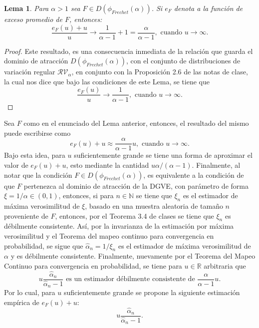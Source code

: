 \documentclass[10.5pt,notitlepage]{article}
\renewcommand{\qedsymbol}{$\blacksquare$}
\newcommand{\RR}{\mathbb{R}}
\newcommand{\NN}{\mathbb{N}}
\theoremstyle{plain}
\newtheorem{lem}[thm]{Lema} %
\newenvironment{rem}
  {\pushQED{\qed}\renewcommand{\qedsymbol}{$\triangle$}\remarkex}
  {\popQED\endremarkex}
\begin{document}
\begin{lem}\label{lem.3}
Para \(\alpha >1 \) sea \(F\in D(\phi_{Frechet}(\alpha))\). Si \(e_{F}\) denota a la función de exceso promedio de \(F\), entonces: 
\[
 \frac{e_{F}(u) + u}{u} \to \frac{1}{\alpha - 1} + 1 = \frac{\alpha}{\alpha -1}, \text{ cuando } u \to \infty.
\]
\end{lem}
\begin{proof}
Este resultado, es una consecuencia inmediata de la relación que guarda el dominio de atracción \(D(\phi_{Frechet}(\alpha))\), con el conjunto de distribuciones de variación regular \(\mathcal{RV}_\alpha\), en conjunto con la Proposición 2.6 de las notas de clase, la cual nos dice que bajo las condiciones de este Lema, se tiene que 
\[
\frac{e_{F}(u)}{u} \to \frac{1}{\alpha - 1}, \text{ cuando } u \to \infty.
\]
\end{proof}
\begin{rem}\label{rem.3}
Sea \(F\) como en el enunciado del Lema anterior, entonces, el resultado del mismo puede escribirse como
\begin{equation*}
    e_{F}(u) + u \approx \frac{\alpha}{\alpha -1}u, \text{ cuando } u \to \infty.
\end{equation*}
Bajo esta idea, para \(u\) suficientemente grande se tiene una forma de aproximar el valor de \(e_{F}(u) + u\), esto mediante la cantidad \(u\alpha/(\alpha -1)\). Finalmente, al notar que la condición \(F\in D(\phi_{Frechet}(\alpha))\), es equivalente a la condición de que \(F\) pertenezca al dominio de atracción de la DGVE, con parámetro de forma \(\xi = 1/\alpha \in (0,1)\), entonces, si para \(n \in \NN\) se tiene que \(\xi_{n}\) es el estimador de máxima verosimilitud de \(\xi\), basado en una muestra aleatoria de tamaño \(n\) proveniente de \(F\), entonces, por el Teorema 3.4 de clases se tiene que \(\xi_{n}\) es débilmente consistente. Así, por la invarianza de la estimación por máxima verosimilitud y el Teorema del mapeo continuo para convergencia en probabilidad, se sigue que \(\hat{\alpha}_{n} = 1/\xi_{n}\) es el estimador de máxima verosimilitud de \(\alpha\) y es débilmente consistente. Finalmente, nuevamente por el Teorema del Mapeo Continuo para convergencia en probabilidad, se tiene para \(u \in \RR\) arbitraria que 
\[
u \frac{\hat{\alpha}_n}{\hat{\alpha}_n - 1} \text{ es un estimador débilmente consistente de }\frac{\alpha}{\alpha -1}u. 
\]
Por lo cual, para \(u\) suficientemente grande se propone la siguiente estimación empírica de \(e_{F}(u) + u\):
\[
u \frac{\hat{\alpha}_n}{\hat{\alpha}_n - 1}.
\]
\end{rem}
\end{document}
